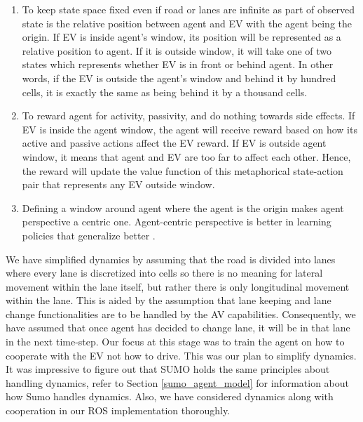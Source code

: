 \begin{enumerate}
    \item To keep state space fixed even if road or lanes are infinite as part of observed state is the relative position between agent and EV with the agent being the origin. If EV is inside agent’s window, its position will be represented as a relative position to agent. If it is outside window, it will take one of two states which represents whether EV is in front or behind agent. In other words, if the EV is outside the agent's window and behind it by hundred cells, it is exactly the same as being behind it by a thousand cells.
    
    \item To reward agent for activity, passivity, and do nothing towards side effects. If EV is inside the agent window, the agent will receive reward based on how its active and passive actions affect the EV reward. If EV is outside agent window, it means that agent and EV are too far to affect each other. Hence, the reward will update the value function of this metaphorical state-action pair that represents any EV outside window. 
    \item Defining a window around agent where the agent is the origin makes agent perspective a centric one. Agent-centric perspective is better in learning policies that generalize better \cite{Ye2020RotationTA}. \\ 
\end{enumerate}

\noindent We have simplified dynamics by assuming that the road is divided into lanes where every lane is discretized into cells so there is no meaning for lateral movement within the lane itself, but rather there is only longitudinal movement within the lane. This is aided by the assumption that lane keeping and lane change functionalities are to be handled by the AV capabilities.  Consequently, we have assumed that once agent has decided to change lane, it will be in that lane in the next time-step. Our focus at this stage was to train the agent on how to cooperate with the EV not how to drive. This was our plan to simplify dynamics. It was impressive to figure out that SUMO holds the same principles about handling dynamics, refer to Section \ref{sumo_agent_model} for information about how Sumo handles dynamics. Also, we have considered dynamics along with cooperation in our ROS implementation thoroughly.




